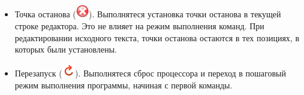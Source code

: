 \begin{itemize}
    \item Точка останова (\includegraphics[width=16pt]{fig/r8asm/image/breakpoint}). Выполнятеся установка точки останова в текущей строке редактора. Это не влияет на режим выполнения команд. При редактировании исходного текста, точки останова остаются в тех позициях, в которых были установлены.
    
    \item Перезапуск (\includegraphics[width=16pt]{fig/r8asm/image/restart}). Выполнятеся сброс процессора и переход в пошаговый режим выполнения программы, начиная с первой команды.    
\end{itemize}
